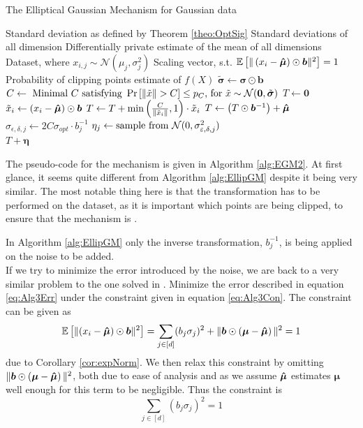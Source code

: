 \documentclass[a4paper,12pt]{article}
\newcommand{\Desc}[2]{\State \makebox[6em][l]{#1}#2}
\begin{document}
\begin{algorithm}[h]
\caption{The Elliptical Gaussian Mechanism for Gaussian data}\label{alg:EGM2}
\begin{algorithmic}
    \Input
    \Desc{$\sigma_{opt} \in \R$}{Standard deviation as defined by Theorem \ref{theo:OptSig}}
    \Desc{$\bm{\sigma} \in \R^{d}$}{Standard deviations of all dimension}
    \Desc{$\bm{\hat{\mu}} \in \R^{d}$}{Differentially private estimate of the mean of all dimensions}
    \Desc{$X \in \R^{n \times d}$}{Dataset, where $x_{i,j} \sim \mathcal{N}(\mu_j,\sigma_j^2)$}
    \Desc{$\bm{b} \in \R^{d}$}{Scaling vector, s.t. $\ee{\lr{x_i - \bm{\hat{\mu}}} \odot \bm{b}} = 1$}
    \Desc{$p_C \in \R$}{Probability of clipping points}
    \EndInput
    \Output
    \State \edp estimate of $f(X)$
    \EndOutput
    \State $\tilde{\bm{\sigma}} \gets \bm{\sigma} \odot \bm{b}$
    \State $C \gets \textnormal{ Minimal $C$ satisfying } \prob{\|\tilde{x}\| > C} \le p_C \textnormal{, for } \tilde{x} \sim \mathcal{N}(\bm{0},\tilde{\bm{\sigma}})$
    \State $T \gets \bm{0}$
        \State $\tilde{x}_i \gets \lr{x_i - \bm{\hat{\mu}}} \odot \bm{b}$
        \State $T \gets T + \min \lr{\frac{C}{\|\tilde{x}_i\|}, 1} \cdot \tilde{x}_i $
    \EndFor
    \State $T \gets \lr{T \odot \bm{b}^{-1}} + \mue$
        \State $\sigma_{\epsilon, \delta, j} \gets 2C\sigma_{opt} \cdot b_j^{-1}$
        \State $\eta_j \gets \textnormal{sample from } \mathcal{N}(0, \sigma_{\epsilon, \delta, j}^2)$
    \EndFor \\
    \Return $T + \bm{\eta}$
\end{algorithmic}
\end{algorithm}
The pseudo-code for the mechanism is given in Algorithm \ref{alg:EGM2}. At first glance, it seems quite different from Algorithm \ref{alg:EllipGM}
despite it being very similar. The most notable thing here
is that the transformation has to be performed on the dataset,
as it is important which points are being clipped, to ensure that the mechanism is \edp.

\noindent In Algorithm \ref{alg:EllipGM} only the inverse transformation, $b_j^{-1}$, is being applied on the noise to be added. \\

\noindent If we try to minimize the error introduced by the noise, we are back to a very similar problem to the one solved in \cite{Lebeda2022}. 
Minimize the error described in equation \eqref{eq:Alg3Err}
under the constraint given in equation \eqref{eq:Alg3Con}.
The constraint can be given as
\begin{equation*}
    \ee{(x_i - \mue) \odot \bm{b}} = \sum_{j \in [d]} (b_j\sigma_j)^2 + \| \bm{b} \odot \lr{\bm{\mu} - \mue} \|^2 = 1
\end{equation*}
due to Corollary \ref{cor:expNorm}. We then relax this constraint by omitting $ \| \bm{b} \odot \lr{ \bm{\mu} - \mue} \|^2$, 
both due to ease of analysis and as we assume $\mue$ estimates $\bm{\mu}$ well enough for this term to be negligible.
Thus the constraint is
\begin{equation}
\label{eq:normcon}
\sum_{j \in [d]} (b_j\sigma_j)^2 = 1
\end{equation}
\end{document}
